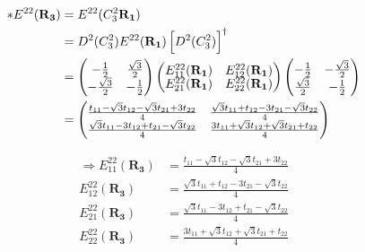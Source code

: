 \documentclass{report}
\begin{document}
\begin{align*}
	\ast E^{22}(\mathbf{R_3}) & = E^{22}(C_3^2\mathbf{ R_1})                                                                                                   \\
	                          & = D^2(C_3^2)  E^{22}(\mathbf{R_1}) \left[ D^2(C_3^2) \right]^\dagger                                                           \\
	                          &
	=
	\begin{pmatrix}
		\renewcommand{\arraystretch}{0.72}
		-\frac{1}{2}        & \frac{\sqrt{3}}{2} \\
		-\frac{\sqrt{3}}{2} & -\frac{1}{2}
	\end{pmatrix}
	\begin{pmatrix}
		E_{11}^{22}(\mathbf{R_1}) & E_{12}^{22}(\mathbf{R_1}) \\
		E_{21}^{22}(\mathbf{R_1}) & E_{22}^{22}(\mathbf{R_1})
	\end{pmatrix}
	\begin{pmatrix}
		-\frac{1}{2}       & -\frac{\sqrt{3}}{2} \\
		\frac{\sqrt{3}}{2} & -\frac{1}{2}
	\end{pmatrix}                                                                                                   \\
	                          & = \begin{pmatrix}
		                              \frac{t_{11} - \sqrt{3}t_{12} - \sqrt{3}t_{21} + 3t_{22}}{4} & \frac{\sqrt{3}t_{11} + t_{12} - 3 t_{21} - \sqrt{3}t_{22}}{4} \\
		                              \frac{\sqrt{3}t_{11} - 3t_{12} + t_{21} - \sqrt{3}t_{22}}{4} & \frac{3t_{11} + \sqrt{3}t_{12} + \sqrt{3}t_{21} + t_{22}}{4}
	                              \end{pmatrix}
\end{align*}

\begin{align*}
	\Rightarrow E_{11}^{22}(\mathbf{R_3}) & = \frac{t_{11} - \sqrt{3}t_{12} - \sqrt{3}t_{21} + 3t_{22}}{4} \\
	E_{12}^{22}(\mathbf{R_3})             & = \frac{\sqrt{3}t_{11} + t_{12} - 3 t_{21} -\sqrt{3}t_{22}}{4} \\
	E_{21}^{22}(\mathbf{R_3})             & = \frac{\sqrt{3}t_{11} - 3t_{12} + t_{21} - \sqrt{3}t_{22}}{4} \\
	E_{22}^{22}(\mathbf{R_3})             & = \frac{3t_{11} + \sqrt{3}t_{12} + \sqrt{3}t_{21} + t_{22}}{4} \\
\end{align*}
\end{document}
